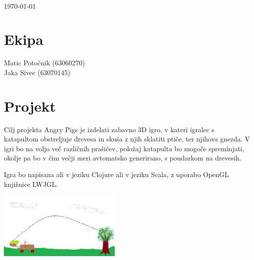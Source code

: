 \documentclass{article}
\begin{document}
\begin{center}
{}\\[0.5cm]
{\huge \today}\ \\[2cm]
\end{center}
\section{Ekipa}
{\large Matic Potočnik (63060270)}\\
{\large Jaka Sivec (63070145)}
\section{Projekt}
Cilj projekta Angry Pigs je izdelati zabavno 3D igro, v kateri igralec s katapultom obstreljuje drevesa in skuša z njih sklatiti ptiče, ter njihova gnezda. V igri bo na voljo več različnih prašičev, položaj katapulta bo mogoče spreminjati, okolje pa bo v čim večji meri avtomatsko generirano, s poudarkom na drevesih.

Igra bo napisana ali v jeziku Clojure ali v jeziku Scala, z uporabo OpenGL knjižnice LWJGL.\\
\begin{center}
\includegraphics[width=6cm]{conceptsmall}
\end{center}
\end{document}
